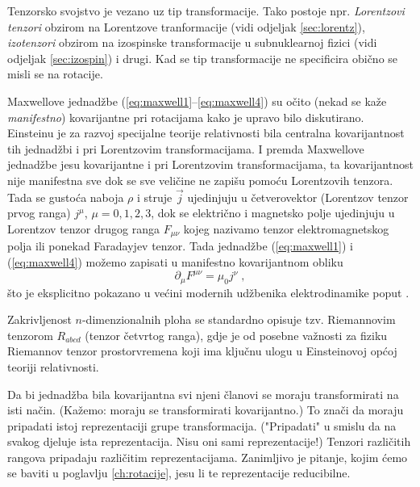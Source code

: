Tenzorsko svojstvo je vezano uz tip transformacije. Tako postoje
npr. \emph{Lorentzovi tenzori} obzirom na Lorentzove tranformacije
(vidi odjeljak \ref{sec:lorentz}), \emph{izotenzori} obzirom na
izospinske transformacije u subnuklearnoj fizici (vidi odjeljak
\ref{sec:izospin}) i drugi.
Kad se tip transformacije ne specificira obično se misli se na rotacije.

\begin{primjer}
 Maxwellove jednadžbe (\ref{eq:maxwell1}--\ref{eq:maxwell4}) su očito
 (nekad se kaže \emph{manifestno}) kovarijantne pri rotacijama kako
 je upravo bilo diskutirano. Einsteinu je za razvoj specijalne teorije relativnosti
 bila centralna kovarijantnost tih jednadžbi i pri Lorentzovim
 transformacijama. I premda Maxwellove jednadžbe jesu kovarijantne
 i pri Lorentzovim transformacijama, ta kovarijantnost
 nije manifestna sve dok se sve veličine ne
 zapišu pomoću Lorentzovih tenzora. Tada se gustoća naboja $\rho$ i
 struje $\vec{j}$ ujedinjuju u četverovektor (Lorentzov tenzor prvog
 ranga) $j^{\mu}$, $\mu=0, 1, 2, 3$, dok se električno i magnetsko
 polje ujedinjuju u Lorentzov tenzor drugog ranga
 $F_{\mu\nu}$ kojeg nazivamo tenzor elektromagnetskog polja ili
  ponekad Faradayjev tenzor. Tada jednadžbe (\ref{eq:maxwell1}) i (\ref{eq:maxwell4})
  možemo zapisati u manifestno kovarijantnom obliku
  \begin{equation}
      \partial_{\mu} F^{\mu\nu} = \mu_0 j^{\nu} \;,
      \label{eq:maxwell4D}
  \end{equation}
  što je eksplicitno pokazano u većini modernih udžbenika 
  elektrodinamike poput \cite{Zangwill:2012}.
\end{primjer}

\begin{primjer}
Zakrivljenost $n$-dimenzionalnih ploha se standardno opisuje
tzv. Riemannovim tenzorom $R_{abcd}$  (tenzor četvrtog ranga),
gdje je od posebne važnosti za fiziku Riemannov tenzor prostorvremena
koji ima ključnu ulogu u Einsteinovoj općoj teoriji relativnosti.
\end{primjer}


Da bi jednadžba bila kovarijantna svi njeni članovi se moraju transformirati
na isti način. (Kažemo: moraju se transformirati kovarijantno.)
To znači da moraju pripadati istoj reprezentaciji grupe transformacija.
("Pripadati" u smislu da na svakog djeluje ista reprezentacija. Nisu oni
sami reprezentacije!) Tenzori različitih rangova pripadaju različitim
reprezentacijama. Zanimljivo je pitanje, kojim ćemo se baviti
u poglavlju \ref{ch:rotacije}, jesu li te reprezentacije reducibilne.
 
